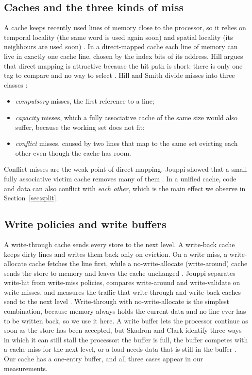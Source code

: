 \subsection{Caches and the three kinds of miss}
A cache keeps recently used lines of memory close to the processor, so it relies on temporal
locality (the same word is used again soon) and spatial locality (its neighbours are used soon)
\cite{smith1982}. In a direct-mapped cache each line of memory can live in exactly one cache
line, chosen by the index bits of its address. Hill argues that direct mapping is attractive
because the hit path is short: there is only one tag to compare and no way to select
\cite{hill1988}. Hill and Smith divide misses into three classes
\cite{hill1989,hp_quant}:
\begin{itemize}
  \item \emph{compulsory} misses, the first reference to a line;
  \item \emph{capacity} misses, which a fully associative cache of the same size would also
        suffer, because the working set does not fit;
  \item \emph{conflict} misses, caused by two lines that map to the same set evicting each
        other even though the cache has room.
\end{itemize}
Conflict misses are the weak point of direct mapping. Jouppi showed that a small fully
associative victim cache removes many of them \cite{jouppi1990}. In a unified cache, code and
data can also conflict with \emph{each other}, which is the main effect we observe in
Section~\ref{sec:split}.

\subsection{Write policies and write buffers}
A write-through cache sends every store to the next level. A write-back cache keeps dirty lines
and writes them back only on eviction. On a write miss, a write-allocate cache fetches the line
first, while a no-write-allocate (write-around) cache sends the store to memory and leaves the
cache unchanged \cite{jouppi1993,hp_quant}. Jouppi separates write-hit from write-miss policies,
compares write-around and write-validate on write misses, and measures the traffic that
write-through and write-back caches send to the next level \cite{jouppi1993}. Write-through with
no-write-allocate is the simplest combination, because memory always holds the current data and
no line ever has to be written back, so we use it here. A write buffer lets the
processor continue as soon as the store has been accepted, but Skadron and Clark identify three
ways in which it can still stall the processor: the buffer is full, the buffer competes with a
cache miss for the next level, or a load needs data that is still in the buffer
\cite{skadron1997}. Our cache has a one-entry buffer, and all three cases appear in our
measurements.
